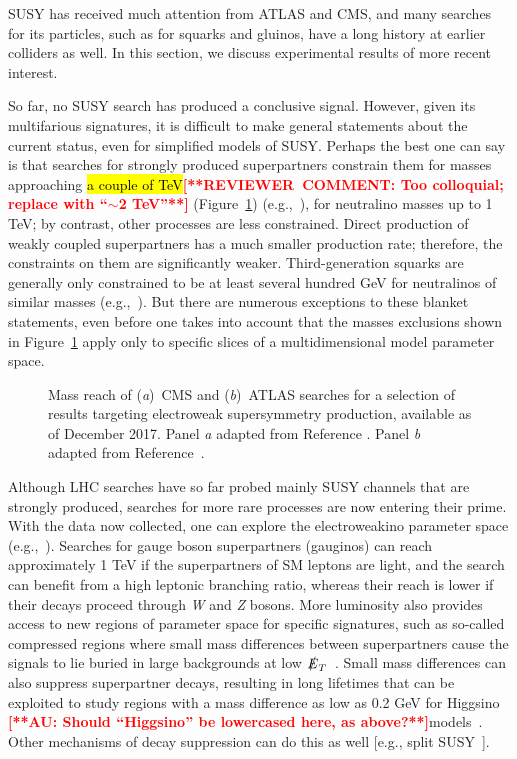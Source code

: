 \documentclass{ar-1col}
\newcommand{\MET}{\ensuremath{\slashed{E}_T}\xspace}
\begin{document}
SUSY has received much attention from ATLAS and CMS, and many
searches for its particles, such as for squarks and gluinos, have
a long history at earlier colliders as well. In this section, we
discuss experimental results of more recent interest.

So far, no SUSY search has produced a conclusive signal. However,
given its multifarious signatures, it is difficult to make general
statements about the current status, even for simplified models of
SUSY. Perhaps the best one can say is that searches for
strongly produced superpartners constrain them for masses
approaching \hl{a couple of TeV}\textbf{\textcolor{red}{[**REVIEWER\ COMMENT: Too colloquial; replace with ``$\sim$2 TeV''**]}} (Figure~\ref{fig:SUSYSummary_ew})
(e.g.,~), for neutralino
masses up to 1 TeV; by contrast, other processes are
less constrained. Direct production of weakly coupled
superpartners has a much smaller production rate; therefore, the
constraints on them are significantly weaker. Third-generation
squarks are generally only constrained to be at least several
hundred GeV for neutralinos of similar masses (e.g.,~). But there are
numerous exceptions to these blanket statements, even before one
takes into account that the masses exclusions shown in Figure~\ref{fig:SUSYSummary_ew} 
apply only to specific slices of a multidimensional model parameter
space.

\begin{figure}[!htpb]
\caption{Mass reach of (\textit{a})\ CMS and (\textit{b})\ ATLAS searches for a selection of
results targeting electroweak supersymmetry production, available as of
December 2017.
Panel \textit{a} adapted from Reference . Panel \textit{b} adapted from Reference~.\label{fig:SUSYSummary_ew}}
\end{figure}

Although LHC searches have so far probed mainly  SUSY channels that are strongly produced, searches for more rare processes are now entering their prime. With the data now collected, one can explore the
electroweakino parameter space (e.g.,~). Searches for gauge
boson superpartners (gauginos) can reach approximately 1 TeV if
the superpartners of SM leptons are light, and the search can
benefit from a high leptonic branching ratio, whereas their reach
is lower if their decays proceed through \textit{W} and \textit{Z} bosons. More
luminosity also provides access to new regions of parameter space
for specific signatures, such as so-called compressed regions where small
mass differences between superpartners cause the signals to lie
buried in large backgrounds at low
\MET~\cite{Aaboud:2017leg,Sirunyan:2017zss}. Small mass
differences can also suppress superpartner decays, resulting in
long lifetimes that can be exploited to study regions with a mass
difference as low as 0.2 GeV for Higgsino
\textbf{\textcolor{red}{[**AU: Should ``Higgsino'' be lowercased here, as above?**]}}models~\cite{ATL-PHYS-PUB-2017-019}. Other mechanisms of decay
suppression can do this as well [e.g., split
SUSY~\cite{Sirunyan:2018vjp}].
\end{document}

